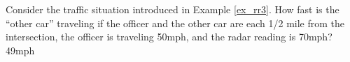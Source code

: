{Consider the traffic situation introduced in Example \ref{ex_rr3}. How fast is the ``other car'' traveling if the officer and the other car are each 1/2 mile from the intersection, the officer is traveling 50mph, and the radar reading is 70mph?
}
{49mph
}

